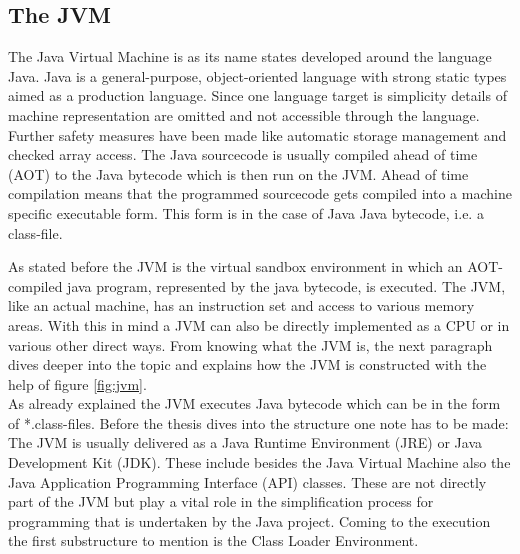 \subsection{The JVM}
The Java Virtual Machine is as its name states developed around the language Java. Java is a general-purpose, object-oriented language with strong static types aimed as a production language. Since one language target is simplicity details of machine representation are omitted and not accessible through the language. Further safety measures have been made like automatic storage management and checked array access. The Java sourcecode is usually compiled ahead of time (AOT) to the Java bytecode which is then run on the JVM. Ahead of time compilation means that the programmed sourcecode gets compiled into a machine specific executable form. This form is in the case of Java Java bytecode, i.e. a class-file.\cite{Gosling}\par As stated before the JVM is the virtual sandbox environment in which an AOT-compiled java program, represented by the java bytecode, is executed. The JVM, like an actual machine, has an instruction set and access to various memory areas. With this in mind a JVM can also be directly implemented as a CPU or in various other direct ways. From knowing what the JVM is, the next paragraph dives deeper into the topic and explains how the JVM is constructed with the help of figure \ref{fig:jvm}.\\
As already explained the JVM executes Java bytecode which can be in the form of *.class-files. Before the thesis dives into the structure one note has to be made: The JVM is usually delivered as a Java Runtime Environment (JRE) or Java Development Kit (JDK). These include besides the Java Virtual Machine also the Java Application Programming Interface (API) classes. These are not directly part of the JVM but play a vital role in the simplification process for programming that is undertaken by the Java project. Coming to the execution the first substructure to mention is the Class Loader Environment.\\
